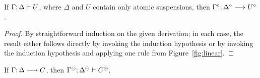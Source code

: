 \bigskip
\begin{theorem}\label{thm:linfocsound}
If ${\Gamma};{\Delta} \vdash {U} \mathstrut$, where $\Delta$ and $U$ contain only
atomic suspensions, then ${\Gamma^\circ};{\Delta^\circ} \longrightarrow {U^\circ} \mathstrut$.
\end{theorem}

\begin{proof}
  By straightforward induction on the given derivation; in each case,
  the result either follows directly by invoking the induction
  hypothesis or by invoking the induction hypothesis and applying one
  rule from Figure~\ref{fig:linear}.
\end{proof}

\begin{theorem}\label{thm:linfoccomplete}
If ${\Gamma};{\Delta} \longrightarrow {C} \mathstrut$,
then ${\Gamma^\ominus};{\Delta^\ominus} \vdash {C^\oplus} \mathstrut$. 
\end{theorem}

